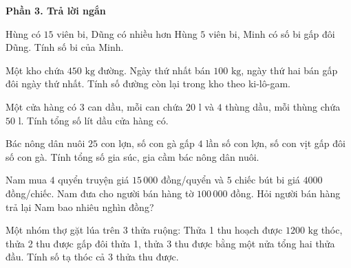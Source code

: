 \textbf{Phần 3. Trả lời ngắn}

\begin{ex} %
Hùng có $15$ viên bi, Dũng có nhiều hơn Hùng $5$ viên bi, Minh có số bi gấp đôi Dũng. Tính số bi của Minh.
\end{ex}

\begin{ex} %
Một kho chứa $450\text{ kg}$ đường. Ngày thứ nhất bán $100\text{ kg}$, ngày thứ hai bán gấp đôi ngày thứ nhất. Tính số đường còn lại trong kho theo ki-lô-gam.
\end{ex}

\begin{ex} %
Một cửa hàng có $3$ can dầu, mỗi can chứa $20\text{ l}$ và $4$ thùng dầu, mỗi thùng chứa $50\text{ l}$. Tính tổng số lít dầu cửa hàng có.
\end{ex}

\begin{ex} %
Bác nông dân nuôi $25$ con lợn, số con gà gấp $4$ lần số con lợn, số con vịt gấp đôi số con gà. Tính tổng số gia súc, gia cầm bác nông dân nuôi.
\end{ex}

\begin{ex} %
Nam mua $4$ quyển truyện giá $15\,000$ đồng/quyển và $5$ chiếc bút bi giá $4000$ đồng/chiếc. Nam đưa cho người bán hàng tờ $100\,000$ đồng. Hỏi người bán hàng trả lại Nam bao nhiêu nghìn đồng?
\end{ex}

\begin{ex} %
Một nhóm thợ gặt lúa trên 3 thửa ruộng: Thửa 1 thu hoạch được $1200\text{ kg}$ thóc, thửa 2 thu được gấp đôi thửa 1, thửa 3 thu được bằng một nửa tổng hai thửa đầu. Tính số tạ thóc cả 3 thửa thu được.
\end{ex}
